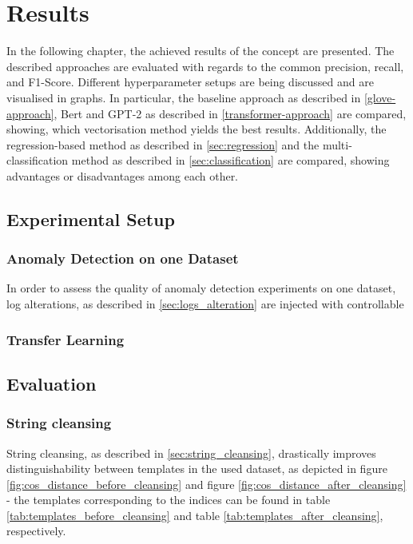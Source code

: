 \chapter{Results\label{cha:results}}

In the following chapter, the achieved results of the concept are presented. The described approaches are evaluated with regards to the common precision, recall, and F1-Score. Different hyperparameter setups are being discussed and are visualised in graphs. In particular, the baseline approach as described in \ref{glove-approach}, Bert and GPT-2 as described in \ref{transformer-approach} are compared, showing, which vectorisation method yields the best results. Additionally, the regression-based method as described in \ref{sec:regression} and the multi-classification method as described in \ref{sec:classification} are compared, showing advantages or disadvantages among each other.





\section{Experimental Setup}

\subsection{Anomaly Detection on one Dataset}
In order to assess the quality of anomaly detection experiments on one dataset, log alterations, as described in \ref{sec:logs_alteration} are injected with controllable 

\subsection{Transfer Learning}






\section{Evaluation}
\subsection{String cleansing}
String cleansing, as described in \ref{sec:string_cleansing}, drastically improves distinguishability between templates in the used dataset, as depicted in figure \ref{fig:cos_distance_before_cleansing} and figure \ref{fig:cos_distance_after_cleansing} - the templates corresponding to the indices can be found in table \ref{tab:templates_before_cleansing} and table \ref{tab:templates_after_cleansing}, respectively.




